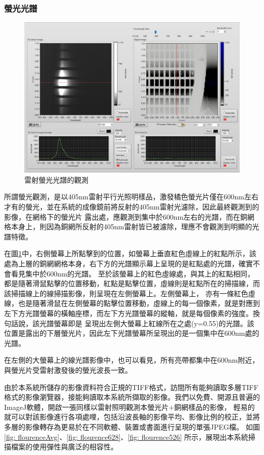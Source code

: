 \documentclass[12pt]{article}
\begin{document}
\subsubsection{螢光光譜}
\begin{figure}
    \centering
    \includegraphics[width = \linewidth]{flourence.jpeg}
    \caption{雷射螢光光譜的觀測}
    \label{fig: flourence}
\end{figure}
所謂螢光觀測，是以405nm雷射平行光照明樣品，激發橘色螢光片僅在600nm左右才有的螢光，並在系統的成像鏡前將反射的405nm雷射光濾除，因此最終觀測到的影像，在網格下的螢光片
露出處，應觀測到集中於600nm左右的光譜，而在銅網格本身上，則因為銅網所反射的405nm雷射皆已被濾除，理應不會觀測到明顯的光譜特徵。

在圖\ref{fig: flourence}中，右側螢幕上所點擊到的位置，如螢幕上垂直紅色虛線上的紅點所示，該處為上層的銅網網格本身，右下方的光譜顯示幕上呈現的是紅點處的光譜，確實不會看見集中於600nm的光譜。
至於該螢幕上的紅色虛線處，與其上的紅點相同，都是隨著滑鼠點擊的位置移動，紅點是點擊位置，虛線則是紅點所在的掃描線，而該掃描線上的線掃描影像，則呈現在左側螢幕上。左側螢幕上，
亦有一條紅色虛線，也是隨著滑鼠在左側螢幕的點擊位置移動，虛線上的每一個像素，就是對應到左下方光譜螢幕的橫軸座標，而左下方光譜螢幕的縱軸，就是每個像素的強度。換句話說，該光譜螢幕即是
呈現出左側大螢幕上紅線所在之處(y=0.55)的光譜。該位置是露出的下層螢光片，因此左下光譜螢幕所呈現出的是一個集中在600nm處的光譜。

在左側的大螢幕上的線光譜影像中，也可以看見，所有亮帶都集中在600nm附近，與螢光片受雷射激發後的螢光波長一致。

由於本系統所儲存的影像資料符合正規的TIFF格式，訪間所有能夠讀取多層TIFF格式的影像瀏覽器，接能夠讀取本系統所擷取的影像。我們以免費、開源且普遍的ImageJ軟體，開啟一張同樣以雷射照明觀測本螢光片+銅網樣品的影像，
輕易的就可以對該影像進行各項處哩，包括沿波長軸的影像平均、影像比例的校正，並將多層的影像轉存為更易於在不同軟體、裝置或書面進行呈現的單張JPEG檔。
如圖\ref{fig: flourenceAvg}、\ref{fig: flourence628}、\ref{fig: flourence526}
所示，展現出本系統掃描檔案的使用彈性與廣泛的相容性。
\end{document}
